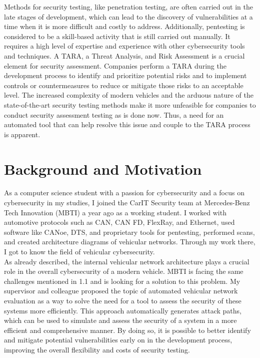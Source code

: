 Methods for security testing, like penetration testing, are often carried out in the late stages of development, which can lead to the discovery of vulnerabilities at a time when it is more difficult and costly to address.
Additionally, pentesting is considered to be a skill-based activity that is still carried out manually.
It requires a high level of expertise and experience with other cybersecurity tools and techniques. 
A TARA, a Threat Analysis, and Risk Assessment is a crucial element for security assessment. 
Companies perform a TARA during the development process to identify and prioritize potential risks and to implement controls or countermeasures to reduce or mitigate those risks to an acceptable level. 
The increased complexity of modern vehicles and the arduous nature of the state-of-the-art security testing methods make it more unfeasible for companies to conduct security assessment testing as is done now. 
Thus, a need for an automated tool that can help resolve this issue and couple to the TARA process is apparent. 


\section{Background and Motivation}
\label{sec:background}

As a computer science student with a passion for cybersecurity and a focus on cybersecurity in my studies, I joined the CarIT Security team at Mercedes-Benz Tech Innovation (MBTI) a year ago as a working student. 
I worked with automotive protocols such as CAN, CAN FD, FlexRay, and Ethernet, used software like CANoe, DTS, and proprietary tools for pentesting, performed scans, and created architecture diagrams of vehicular networks. 
Through my work there, I got to know the field of vehicular cybersecurity.
\\

As already described, the internal vehicular network architecture plays a crucial role in the overall cybersecurity of a modern vehicle. 
MBTI is facing the same challenges mentioned in 1.1 and is looking for a solution to this problem. 
My supervisor and colleague proposed the topic of automated vehicular network evaluation as a way to solve the need for a tool to assess the security of these systems more efficiently. 
This approach automatically generates attack paths, which can be used to simulate and assess the security of a system in a more efficient and comprehensive manner. 
By doing so, it is possible to better identify and mitigate potential vulnerabilities early on in the development process, improving the overall flexibility and costs of security testing. 
